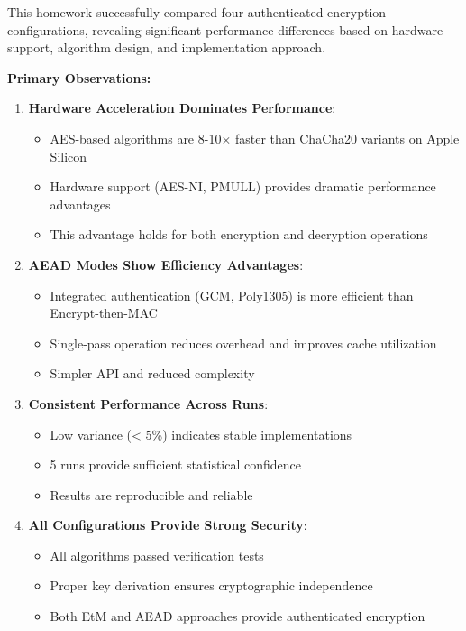 \documentclass[12pt,a4paper]{article}
\begin{document}
This homework successfully compared four authenticated encryption configurations, revealing significant performance differences based on hardware support, algorithm design, and implementation approach.

\textbf{Primary Observations:}

\begin{enumerate}
    \item \textbf{Hardware Acceleration Dominates Performance}:
    \begin{itemize}
        \item AES-based algorithms are 8-10× faster than ChaCha20 variants on Apple Silicon
        \item Hardware support (AES-NI, PMULL) provides dramatic performance advantages
        \item This advantage holds for both encryption and decryption operations
    \end{itemize}
    
    \item \textbf{AEAD Modes Show Efficiency Advantages}:
    \begin{itemize}
        \item Integrated authentication (GCM, Poly1305) is more efficient than Encrypt-then-MAC
        \item Single-pass operation reduces overhead and improves cache utilization
        \item Simpler API and reduced complexity
    \end{itemize}
    
    \item \textbf{Consistent Performance Across Runs}:
    \begin{itemize}
        \item Low variance (< 5\%) indicates stable implementations
        \item 5 runs provide sufficient statistical confidence
        \item Results are reproducible and reliable
    \end{itemize}
    
    \item \textbf{All Configurations Provide Strong Security}:
    \begin{itemize}
        \item All algorithms passed verification tests
        \item Proper key derivation ensures cryptographic independence
        \item Both EtM and AEAD approaches provide authenticated encryption
    \end{itemize}
\end{enumerate}
\end{document}
